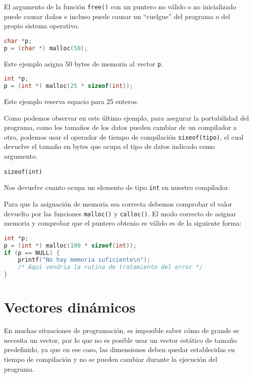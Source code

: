 {El argumento de la función \texttt{free()} con un puntero no válido o no inicializado puede causar daños e incluso puede causar un ``cuelgue'' del programa o del propio sistema operativo.

\begin{Ejemplo}
\begin{lstlisting}[language=C]
char *p;
p = (char *) malloc(50);
\end{lstlisting}
\Explicacion
Este ejemplo asigna 50 bytes de memoria al vector \texttt{p}.
\end{Ejemplo}
\begin{Ejemplo}
\begin{lstlisting}[language=C]
int *p;
p = (int *) malloc(25 * sizeof(int));
\end{lstlisting}
\Explicacion
Este ejemplo reserva espacio para 25 enteros.
\end{Ejemplo}
Como podemos observar en este último ejemplo, para asegurar la portabilidad del programa, como los tamaños de los datos pueden cambiar de un compilador a otro, podemos usar el operador de tiempo de compilación \texttt{sixeof(tipo)}, el cual devuelve el tamaño en bytes que ocupa el tipo de datos indicado como argumento.
\begin{Ejemplo}
\texttt{sizeof(int)}

Nos devuelve cuanto ocupa un elemento de tipo \texttt{int} en nuestro compilador.\\
\end{Ejemplo}

Para que la asignación de memoria sea correcta debemos comprobar el valor devuelto por las funciones \texttt{malloc()} y \texttt{calloc()}. El modo correcto de asignar memoria y comprobar que el puntero obtenio es válido es de la siguiente forma:
\begin{lstlisting}[language=C]
int *p;
p = (int *) malloc(100 * sizeof(int));
if (p == NULL) {
    printf("No hay memoria suficiente\n");
    /* Aqui vendria la rutina de tratamiento del error */
}
\end{lstlisting}
}

\section{Vectores dinámicos}
En muchas situaciones de programación, es imposible saber cómo de grande se necesita un vector, por lo que no es posible usar un vector estático de tamaño predefinido, ya que en ese caso, las dimensiones deben quedar establecidas en tiempo de compilación y no se pueden cambiar durante la ejecución del programa.

